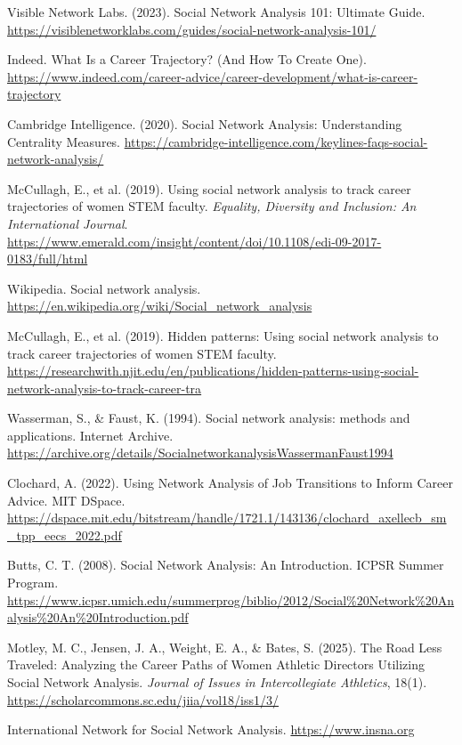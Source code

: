 \documentclass[../main.tex]{subfiles}
\begin{document}
\begin{thebibliography}{99}

Visible Network Labs. (2023). Social Network Analysis 101: Ultimate Guide. \url{https://visiblenetworklabs.com/guides/social-network-analysis-101/}

Indeed. What Is a Career Trajectory? (And How To Create One). \url{https://www.indeed.com/career-advice/career-development/what-is-career-trajectory}

Cambridge Intelligence. (2020). Social Network Analysis: Understanding Centrality Measures. \url{https://cambridge-intelligence.com/keylines-faqs-social-network-analysis/}

McCullagh, E., et al. (2019). Using social network analysis to track career trajectories of women STEM faculty. \textit{Equality, Diversity and Inclusion: An International Journal}. \url{https://www.emerald.com/insight/content/doi/10.1108/edi-09-2017-0183/full/html}

Wikipedia. Social network analysis. \url{https://en.wikipedia.org/wiki/Social_network_analysis}

McCullagh, E., et al. (2019). Hidden patterns: Using social network analysis to track career trajectories of women STEM faculty. \url{https://researchwith.njit.edu/en/publications/hidden-patterns-using-social-network-analysis-to-track-career-tra}

Wasserman, S., \& Faust, K. (1994). Social network analysis: methods and applications. Internet Archive. \url{https://archive.org/details/SocialnetworkanalysisWassermanFaust1994}

Clochard, A. (2022). Using Network Analysis of Job Transitions to Inform Career Advice. MIT DSpace. \url{https://dspace.mit.edu/bitstream/handle/1721.1/143136/clochard_axellecb_sm_tpp_eecs_2022.pdf}

Butts, C. T. (2008). Social Network Analysis: An Introduction. ICPSR Summer Program. \url{https://www.icpsr.umich.edu/summerprog/biblio/2012/Social\%20Network\%20Analysis\%20An\%20Introduction.pdf}

Motley, M. C., Jensen, J. A., Weight, E. A., \& Bates, S. (2025). The Road Less Traveled: Analyzing the Career Paths of Women Athletic Directors Utilizing Social Network Analysis. \textit{Journal of Issues in Intercollegiate Athletics}, 18(1). \url{https://scholarcommons.sc.edu/jiia/vol18/iss1/3/}

International Network for Social Network Analysis. \url{https://www.insna.org}

\end{thebibliography}
\end{document}
